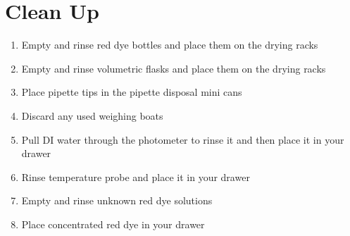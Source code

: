 \documentclass[letterpaper,10pt,english]{sphinxmanual}
\begin{document}
\section{Clean Up}
\label{\detokenize{Laboratory_Measurements/Laboratory_Measurements:clean-up}}\begin{enumerate}
\item {} 
Empty and rinse red dye bottles and place them on the drying racks

\item {} 
Empty and rinse volumetric flasks and place them on the drying racks

\item {} 
Place pipette tips in the pipette disposal mini cans

\item {} 
Discard any used weighing boats

\item {} 
Pull DI water through the photometer to rinse it and then place it in your drawer

\item {} 
Rinse temperature probe and place it in your drawer

\item {} 
Empty and rinse unknown red dye solutions

\item {} 
Place concentrated red dye in your drawer

\end{enumerate}
\end{document}
